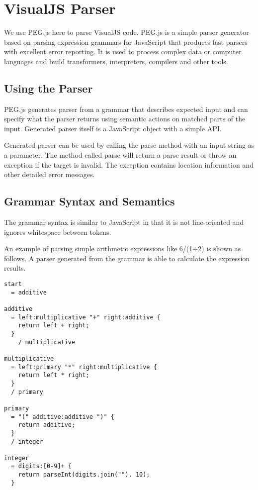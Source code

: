 \section {VisualJS Parser}
We use PEG.js here to parse VisualJS code. PEG.js is a simple parser generator based on parsing expression grammars \cite{Ford:2004:PEG:982962.964011} for JavaScript that produces fast parsers with excellent error reporting. It is used to process complex data or computer languages and build transformers, interpreters, compilers and other tools.

\subsection {Using the Parser}
PEG.js generates parser from a grammar that describes expected input and can specify what the parser returns using semantic actions on matched parts of the input. Generated parser itself is a JavaScript object with a simple API.

Generated parser can be used by calling the parse method with an input string as a parameter. The method called parse will return a parse result or throw an exception if the target is invalid. The exception contains location information and other detailed error messages.

\subsection {Grammar Syntax and Semantics}
The grammar syntax is similar to JavaScript in that it is not line-oriented and ignores whitespace between tokens.

An example of parsing simple arithmetic expressions like 6/(1+2) is shown as follows. A parser generated from the grammar is able to calculate the expression results.

\begin{lstlisting}
start
  = additive

additive
  = left:multiplicative "+" right:additive {
  	return left + right;
  }
 	/ multiplicative

multiplicative
  = left:primary "*" right:multiplicative {
  	return left * right;
  }
  / primary

primary
  = "(" additive:additive ")" {
  	return additive;
  }
  / integer

integer
  = digits:[0-9]+ {
  	return parseInt(digits.join(""), 10);
  }
\end{lstlisting}

